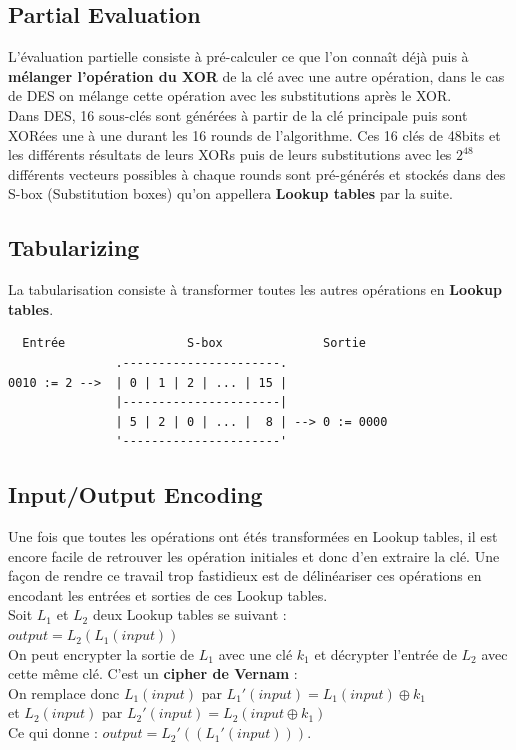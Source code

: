 \documentclass[a4paper,12pt]{article}
\begin{document}
\subsection{Partial Evaluation}

L'évaluation partielle consiste à pré-calculer ce que l'on connaît déjà puis à \textbf{mélanger l'opération du XOR} de la clé avec une autre opération, dans le cas de DES on mélange cette opération avec les substitutions après le XOR.\\
Dans DES, 16 sous-clés sont générées à partir de la clé principale puis sont XORées une à une durant les 16 rounds de l'algorithme. Ces 16 clés de 48bits et les différents résultats de leurs XORs puis de leurs substitutions avec les $2^{48}$ différents vecteurs possibles à chaque rounds sont pré-générés et stockés dans des S-box (Substitution boxes) qu'on appellera \textbf{Lookup tables} par la suite.


\subsection{Tabularizing}

La tabularisation consiste à transformer toutes les autres opérations en \textbf{Lookup tables}.

\begin{verbatim}
  Entrée                 S-box              Sortie
               .----------------------.
0010 := 2 -->  | 0 | 1 | 2 | ... | 15 |
               |----------------------|
               | 5 | 2 | 0 | ... |  8 | --> 0 := 0000
               '----------------------'
\end{verbatim}


\subsection{Input/Output Encoding}

Une fois que toutes les opérations ont étés transformées en Lookup tables, il est encore facile de retrouver les opération initiales et donc d'en extraire la clé. Une façon de rendre ce travail trop fastidieux est de délinéariser ces opérations en encodant les entrées et sorties de ces Lookup tables.\\

Soit $L_1$ et $L_2$ deux Lookup tables se suivant :\\
$output = L_2(L_1(input))$\\
On peut encrypter la sortie de $L_1$ avec une clé $k_1$ et décrypter l'entrée de $L_2$ avec cette même clé. C'est un \textbf{cipher de Vernam} :\\
On remplace donc $L_1(input)$ par $L_1'(input) = L_1(input) \oplus k_1$\\
et $L_2(input)$ par $L_2'(input) = L_2(input \oplus k_1)$\\
Ce qui donne : $output = L_2'((L_1'(input)))$.\\
\end{document}
